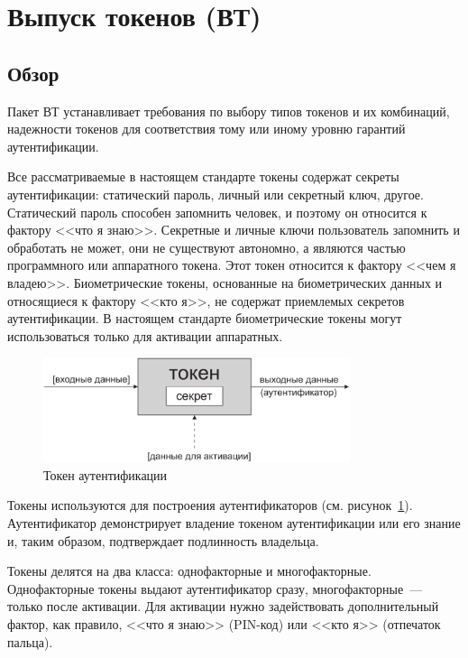 \section{Выпуск токенов (ВТ)}\label{TI}

\subsection{Обзор}\label{TI.Intro}

Пакет ВТ устанавливает требования по выбору типов токенов и их комбинаций, 
надежности токенов для соответствия тому или иному уровню гарантий 
аутентификации. 

Все рассматриваемые в настоящем стандарте токены содержат секреты
аутентификации: статический пароль, личный или секретный ключ, другое.
%
Статический пароль способен запомнить человек, и поэтому он относится к фактору
<<что я знаю>>. Секретные и личные ключи пользователь запомнить и обработать не
может, они не существуют автономно, а являются частью программного или
аппаратного токена. Этот токен относится к фактору <<чем я владею>>.
%
Биометрические токены, основанные на биометрических данных и относящиеся к 
фактору <<кто я>>, не содержат приемлемых секретов аутентификации. В настоящем 
стандарте биометрические токены могут использоваться только для активации 
аппаратных.

\begin{figure}[bht]
\begin{center}
\includegraphics[width=9cm]{../figs/Token}
\end{center}
\caption{Токен аутентификации}
\label{Fig.TI.Token}
\end{figure}

Токены используются для построения аутентификаторов (см. 
рисунок~\ref{Fig.TI.Token}). Аутентификатор демонстрирует владение 
токеном аутентификации или его знание и, таким образом, подтверждает 
подлинность владельца.

Токены делятся на два класса: однофакторные и многофакторные.
Однофакторные токены выдают аутентификатор сразу, многофакторные~---
только после активации. Для активации нужно задействовать дополнительный 
фактор, как правило, <<что я знаю>> (PIN-код) или <<кто я>> (отпечаток пальца).

